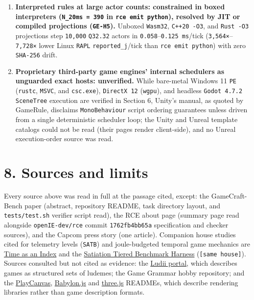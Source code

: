 \documentclass[10pt,letterpaper]{article}
\begin{document}
\begin{enumerate}
  Form projection preserves bitwise behavior parity, whereas parse-only
  dynamic checking misses \texttt{93.85\%} (\texttt{122\ /\allowbreak{}\ 130}) of
  injected cross-layer and semantic faults (\texttt{F1\ =\ 0.\allowbreak{}1159}).
\item
  \textbf{Interpreted rules at large actor counts: constrained in boxed
  interpreters (\texttt{N\_\allowbreak{}20ms\ =\ 390} in \texttt{rce\ emit\ python}),
  resolved by JIT or compiled projections (\texttt{GE-H5}).} Unboxed
  \texttt{Wasm32}, \texttt{C++20\ -\allowbreak{}O3}, and \texttt{Rust\ -O3}
  projections step \texttt{10,000} \texttt{Q32.32} actors in
  \texttt{0.058}--\texttt{0.125\ ms}/\allowbreak{}tick
  (\texttt{3,564×}--\texttt{7,728×} lower Linux \texttt{RAPL}
  \texttt{reported\_\allowbreak{}j}/tick than \texttt{rce\ emit\ python}) with zero
  \texttt{SHA-256} drift.
\item
  \textbf{Proprietary third-party game engines' internal schedulers as
  unguarded exact hosts: unverified.} While bare-metal Windows 11
  \texttt{PE} (\texttt{rustc}, \texttt{MSVC}, and \texttt{csc.exe}),
  \texttt{DirectX\ 12} (\texttt{wgpu}), and headless
  \texttt{Godot\ 4.\allowbreak{}7.\allowbreak{}2} \texttt{SceneTree} execution are verified in
  Section 6, Unity's manual, as quoted by GameRule, disclaims
  \texttt{MonoBehaviour} script ordering guarantees unless driven from a
  single deterministic scheduler loop; the Unity and Unreal template
  catalogs could not be read (their pages render client-side), and no
  Unreal execution-order source was read.
\end{enumerate}

\section{8. Sources and limits}\label{sources-and-limits}

Every source above was read in full at the passage cited, except: the
GameCraft-Bench paper (abstract, repository README, task directory
layout, and \texttt{tests/\allowbreak{}test.\allowbreak{}sh} verifier script read), the RCE about
page (summary page read alongside \texttt{openIE-\allowbreak{}dev/\allowbreak{}rce} commit
\texttt{1762fb4bb65a} specification and checker sources), and the Capcom
press story (one article). Companion house studies cited for telemetry
levels (\texttt{SATB}) and joule-budgeted temporal game mechanics are
\href{https://research.openie.dev/papers/time-as-an-index/}{Time as an
Index} and the
\href{https://research.openie.dev/papers/satb-harness/}{Satiation Tiered
Benchmark Harness} (\texttt{{[}same\ house{]}}). Sources consulted but
not cited as evidence: the \href{https://ludii.games/}{Ludii portal},
which describes games as structured sets of ludemes; the Game Grammar
hobby repository; and the
\href{https://github.com/playcanvas/engine}{PlayCanvas},
\href{https://github.com/BabylonJS/Babylon.js}{Babylon.js} and
\href{https://github.com/mrdoob/three.js}{three.js} READMEs, which
describe rendering libraries rather than game description formats.
\end{document}
